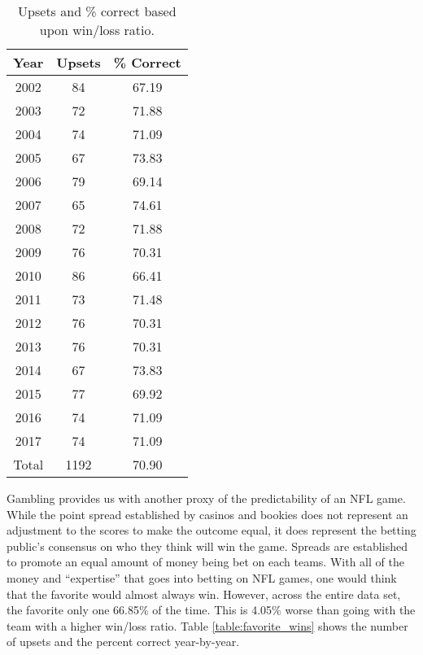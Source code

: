 \documentclass[11pt]{article}
\begin{document}
\begin{table}[!htb]
\begin{center}
\scriptsize
\begin{tabular}{|c|c|c|}
\hline
Year & Upsets & \% Correct\\
\hline
2002 & 84 & 67.19\\
2003 & 72 & 71.88\\
2004 & 74 & 71.09\\
2005 & 67 & 73.83\\
2006 & 79 & 69.14\\
2007 & 65 & 74.61\\
2008 & 72 & 71.88\\
2009 & 76 & 70.31\\
2010 & 86 & 66.41\\
2011 & 73 & 71.48\\
2012 & 76 & 70.31\\
2013 & 76 & 70.31\\
2014 & 67 & 73.83\\
2015 & 77 & 69.92\\
2016 & 74 & 71.09\\
2017 & 74 & 71.09\\
\hline
Total & 1192 & 70.90\\
\hline
\end{tabular}
\caption{Upsets and \% correct based upon win/loss ratio.}\label{table:win_loss_upsets}
\end{center}
\end{table}

Gambling provides us with another proxy of the predictability of an NFL game. While the point spread established by casinos and bookies does not represent an adjustment to the scores to make the outcome equal, it does represent the betting public's consensus on who they think will win the game. Spreads are established to promote an equal amount of money being bet on each teams. With all of the money and ``expertise'' that goes into betting on NFL games, one would think that the favorite would almost always win. However, across the entire data set, the favorite only one 66.85\% of the time. This is 4.05\% worse than going with the team with a higher win/loss ratio. Table \ref{table:favorite_wins} shows the number of upsets and the percent correct year-by-year.
\end{document}
